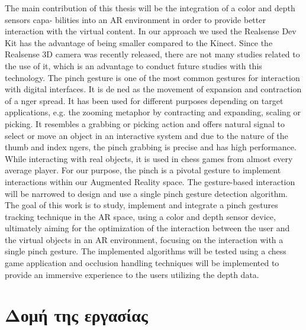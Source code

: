 The main contribution of this thesis will be the integration of a color and depth sensors capa- bilities into an AR environment in order to provide better interaction with the virtual content. In our approach we used the Realsense Dev Kit has the advantage of being smaller compared to the Kinect. Since the Realsense 3D camera was recently released, there are not many studies related to the use of it, which is an advantage to conduct future studies with this technology. The pinch gesture is one of the most common gestures for interaction with digital interfaces. It is de ned as the movement of expansion and contraction of a nger spread. It has been used for different purposes depending on target applications, e.g. the zooming metaphor by contracting and expanding, scaling or picking. It resembles a grabbing or picking action and offers natural signal to select or move an object in an interactive system and due to the nature of the thumb and index ngers, the pinch grabbing is precise and has high performance. While interacting with real objects, it is used in chess games from almost every average player. For our purpose, the pinch is a pivotal gesture to implement interactions within our Augmented Reality space. The gesture-based interaction will be narrowed to design and use a single pinch gesture detection algorithm. The goal of this work is to study, implement and integrate a pinch gestures tracking technique in the AR space, using a color and depth sensor device, ultimately aiming for the optimization of the interaction between the user and the virtual objects in an AR environment, focusing on the interaction with a single pinch gesture. The implemented algorithms will be tested using a chess game application and occlusion handling techniques will be implemented to provide an immersive experience to the users utilizing the depth data.


\section{Δομή της εργασίας}

